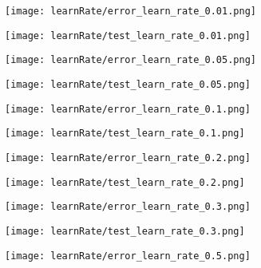 \documentclass{article}
\begin{document}
\newpage
\begin{figure}[!htb]
  \centering
  \texttt{[image: learnRate/error\_learn\_rate\_0.01.png]}
\end{figure}

\begin{figure}[!htb]
  \centering
  \texttt{[image: learnRate/test\_learn\_rate\_0.01.png]}
\end{figure}

\begin{figure}[]
  \centering
  \texttt{[image: learnRate/error\_learn\_rate\_0.05.png]}
\end{figure}

\begin{figure}[]
  \centering
  \texttt{[image: learnRate/test\_learn\_rate\_0.05.png]}
\end{figure}

\begin{figure}[]
  \centering
  \texttt{[image: learnRate/error\_learn\_rate\_0.1.png]}
\end{figure}

\begin{figure}[]
  \centering
  \texttt{[image: learnRate/test\_learn\_rate\_0.1.png]}
\end{figure}

\begin{figure}[]
  \centering
  \texttt{[image: learnRate/error\_learn\_rate\_0.2.png]}
\end{figure}

\begin{figure}[]
  \centering
  \texttt{[image: learnRate/test\_learn\_rate\_0.2.png]}
\end{figure}

\begin{figure}[]
  \centering
  \texttt{[image: learnRate/error\_learn\_rate\_0.3.png]}
\end{figure}

\begin{figure}[]
  \centering
  \texttt{[image: learnRate/test\_learn\_rate\_0.3.png]}
\end{figure}

\begin{figure}[]
  \centering
  \texttt{[image: learnRate/error\_learn\_rate\_0.5.png]}
\end{figure}
\end{document}

